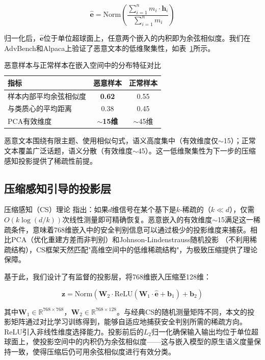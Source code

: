 \documentclass[conference]{IEEEtran}
\begin{document}
\begin{equation}
\hat{\mathbf{e}} = \text{Norm}\left(\frac{\sum_{i=1}^{n} m_i \cdot \mathbf{h}_i}{\sum_{i=1}^{n} m_i}\right)
\label{eq:embedding}
\end{equation}

\noindent 归一化后，$\hat{\mathbf{e}}$位于单位超球面上，任意两个嵌入的内积即为余弦相似度。我们在AdvBench和Alpaca上验证了恶意文本的低维聚集性，如表~\ref{tab:clustering}所示。

\begin{table}[t]
\centering
\caption{恶意样本与正常样本在嵌入空间中的分布特征对比}
\label{tab:clustering}
\begin{tabular}{lcc}
\toprule
\textbf{指标} & \textbf{恶意样本} & \textbf{正常样本} \\
\midrule
样本内部平均余弦相似度 & \textbf{0.62} & 0.55 \\
与类质心的平均距离 & 0.38 & 0.45 \\
PCA有效维度 & \textbf{$\sim$15维} & $\sim$45维 \\
\bottomrule
\end{tabular}
\end{table}

恶意文本围绕有限主题、使用相似句式，语义高度集中（有效维度仅$\sim$15）；正常文本覆盖广泛话题，语义分散（有效维度$\sim$45）。这一低维聚集性为下一步的压缩感知投影提供了稀疏性前提。

\subsection{压缩感知引导的投影层}

压缩感知（CS）理论 \cite{b15,b16} 指出：如果$d$维信号在某个基下是$k$-稀疏的（$k \ll d$），仅需$O(k \log(d/k))$次线性测量即可精确恢复。恶意嵌入的有效维度$\sim$15满足这一稀疏条件，意味着768维嵌入中的安全判别信息可以通过极少的投影维度来捕获。相比PCA（优化重建方差而非判别）和Johnson-Lindenstrauss随机投影 \cite{b14}（不利用稀疏结构），CS框架天然匹配"高维空间中的低维稀疏结构"，为极致压缩提供了理论保障。

基于此，我们设计了有监督的投影层，将768维嵌入压缩至128维：

\begin{equation}
\mathbf{z} = \text{Norm}\left(\mathbf{W}_2 \cdot \text{ReLU}(\mathbf{W}_1 \cdot \hat{\mathbf{e}} + \mathbf{b}_1) + \mathbf{b}_2\right)
\label{eq:projection}
\end{equation}

\noindent 其中$\mathbf{W}_1 \in \mathbb{R}^{768 \times 768}$，$\mathbf{W}_2 \in \mathbb{R}^{768 \times 128}$。与经典CS的随机测量矩阵不同，本文的投影矩阵通过对比学习训练得到，能够自适应地捕获安全判别所需的稀疏方向。ReLU引入非线性维度选择能力。投影前后的$L_2$归一化确保输入输出均位于单位超球面上，使投影空间中的内积仍为余弦相似度——这与嵌入模型的原生语义度量保持一致，使得压缩后仍可用余弦相似度进行有效分类。
\end{document}
